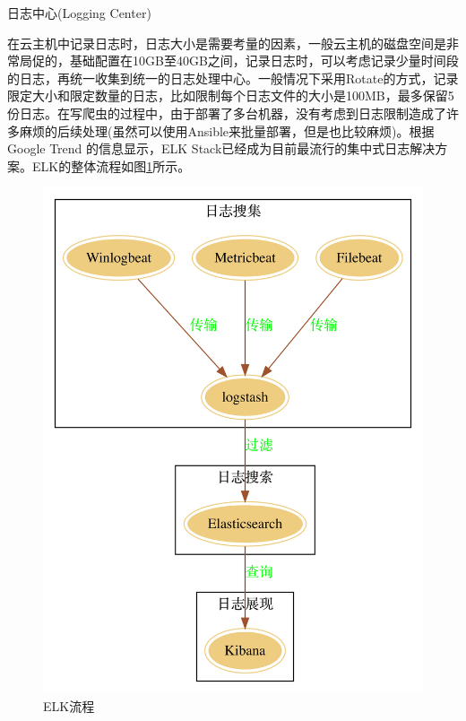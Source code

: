 \documentclass[8pt]{book}
\makeatletter
\numberwithin{dummy}{section}
\theoremstyle{ocrenumbox}
\theoremstyle{blacknumex}
\theoremstyle{blacknumbox}
\theoremstyle{ocrenum}
\renewcommand{\section}{\@startsection{section}{1}{\z@}
	{-4ex \@plus -1ex \@minus -.4ex}
	{1ex \@plus.2ex }
	{\normalfont\large\sffamily\bfseries}}
\makeatother
\begin{document}
\section{日志中心(Logging Center)}

在云主机中记录日志时，日志大小是需要考量的因素，一般云主机的磁盘空间是非常局促的，基础配置在10GB至40GB之间，记录日志时，可以考虑记录少量时间段的日志，再统一收集到统一的日志处理中心。一般情况下采用Rotate的方式，记录限定大小和限定数量的日志，比如限制每个日志文件的大小是100MB，最多保留5份日志。在写爬虫的过程中，由于部署了多台机器，没有考虑到日志限制造成了许多麻烦的后续处理(虽然可以使用Ansible来批量部署，但是也比较麻烦)。根据Google Trend 的信息显示，ELK Stack已经成为目前最流行的集中式日志解决方案。ELK的整体流程如图\ref{fig:elklogarchitecture}所示。

\begin{figure}[htbp]
	\centering
	\includegraphics[scale=0.05]{elk-log-architecture.jpg}
	\caption{ELK流程}
	\label{fig:elklogarchitecture}
\end{figure}
\end{document}
